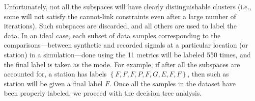Unfortunately, not all the subspaces will have clearly distinguishable clusters (i.e., some will not satisfy the cannot-link constraints even after a large number of iterations). Such subspaces are discarded, and all others are used to label the data. In an ideal case, each subset of data samples corresponding to the comparisons---between synthetic and recorded signals at a particular location (or station) in a simulation---done using the 11 metrics will be labeled 550 times, and the final label is taken as the mode. For example, if after all the subspaces are accounted for, a station has labels $\left\{F, F, F, P, F, G, E, F, F\right\}$, then such as station will be given a final label $F$. Once all the samples in the dataset have been properly labeled, we proceed with the decision tree analysis.
